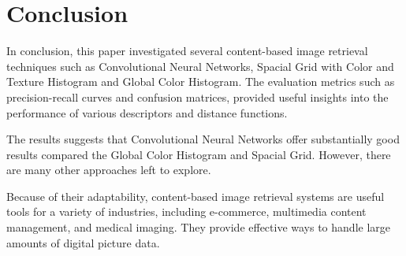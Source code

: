 \documentclass[10pt,a4paper,onecolumn]{article} %
\begin{document}
{
\hypersetup{linkcolor=black}
\tableofcontents
}

\newpage





\section{Conclusion}
\label{sec:conclusion}

In conclusion, this paper investigated several content-based image retrieval techniques such as Convolutional Neural
Networks, Spacial Grid with Color and Texture Histogram and Global Color Histogram. The evaluation metrics such as
precision-recall curves and confusion matrices, provided useful insights into the performance of various descriptors and
distance functions.

The results suggests that Convolutional Neural Networks offer substantially good results compared the Global Color
Histogram and Spacial Grid. However, there are many other approaches left to explore.

Because of their adaptability, content-based image retrieval systems are useful tools for a variety of industries,
including e-commerce, multimedia content management, and medical imaging. They provide effective ways to handle large
amounts of digital picture data.

{\small


}
\end{document}
